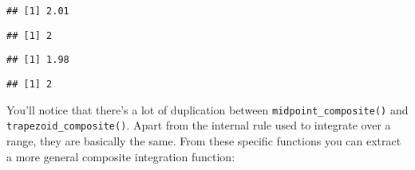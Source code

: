 \begin{verbatim}
## [1] 2.01
\end{verbatim}

\begin{Shaded}
\begin{Highlighting}[]
 \NormalTok{)}
\end{Highlighting}
\end{Shaded}

\begin{verbatim}
## [1] 2
\end{verbatim}

\begin{Shaded}
\begin{Highlighting}[]
 \NormalTok{)}
\end{Highlighting}
\end{Shaded}

\begin{verbatim}
## [1] 1.98
\end{verbatim}

\begin{Shaded}
\begin{Highlighting}[]
 \NormalTok{)}
\end{Highlighting}
\end{Shaded}

\begin{verbatim}
## [1] 2
\end{verbatim}

You'll notice that there's a lot of duplication between
\texttt{midpoint\_composite()} and \texttt{trapezoid\_composite()}.
Apart from the internal rule used to integrate over a range, they are
basically the same. From these specific functions you can extract a more
general composite integration function:

